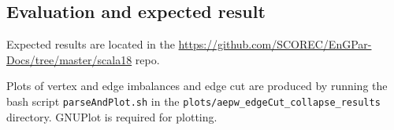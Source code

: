 \subsection{Evaluation and expected result}

Expected results are located in the 
\url{https://github.com/SCOREC/EnGPar-Docs/tree/master/scala18}
repo.

Plots of vertex and edge imbalances and edge cut are produced by
running the bash script \texttt{parseAndPlot.sh} in the
\texttt{plots/aepw\_edgeCut\_collapse\_results} directory.
GNUPlot is required for plotting.

